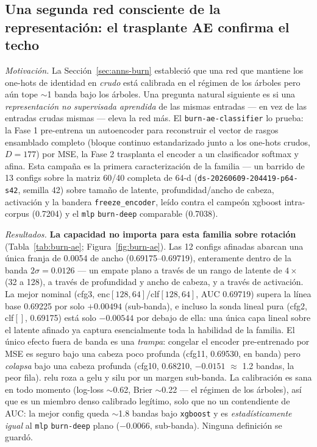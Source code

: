 \documentclass[11pt]{article}
\newcommand{\dsid}[1]{\texttt{\small #1}}
\begin{document}
\subsection{Una segunda red consciente de la representación: el trasplante AE confirma el techo}
\label{sec:anns-ae}
\emph{Motivación.} La Sección~\ref{sec:anns-burn} estableció que una red que
mantiene los one-hots de identidad en \emph{crudo} está calibrada en el régimen de
los árboles pero aún tope $\sim$1 banda bajo los árboles. Una pregunta natural
siguiente es si una \emph{representación no supervisada aprendida} de las mismas
entradas --- en vez de las entradas crudas mismas --- eleva la red más. El
\texttt{burn-ae-classifier} lo prueba: la Fase 1 pre-entrena un autoencoder para
reconstruir el vector de rasgos ensamblado completo (bloque continuo estandarizado
junto a los one-hots crudos, $D{=}177$) por MSE, la Fase 2 trasplanta el encoder a
un clasificador softmax y afina. Esta campaña es la primera caracterización de la
familia --- un barrido de 13 configs sobre la matriz 60/40 completa de 64-d
(\dsid{ds-20260609-204419-p64-s42}, semilla 42) sobre tamaño de latente,
profundidad/ancho de cabeza, activación y la bandera \texttt{freeze\_encoder},
leído contra el campeón xgboost intra-corpus (\num{0.7204}) y el \texttt{mlp}
\texttt{burn-deep} comparable (\num{0.7038}).

\emph{Resultados.} \textbf{La capacidad no importa para esta familia sobre
rotación} (Tabla~\ref{tab:burn-ae}; Figura~\ref{fig:burn-ae}). Las 12 configs
afinadas abarcan una única franja de \num{0.0054} de ancho
(\num{0.69175}--\num{0.69719}), enteramente dentro de la banda $2\sigma=0.0126$ ---
un empate plano a través de un rango de latente de $4\times$ (32 a 128), a través
de profundidad y ancho de cabeza, y a través de activación. La mejor nominal
(cfg3, enc$[128,64]$/clf$[128,64]$, AUC \num{0.69719}) supera la línea base
\num{0.69225} por solo $+0.00494$ (sub-banda), e incluso la sonda lineal pura
(cfg2, clf$[]$, \num{0.69175}) está solo $-0.00544$ por debajo de ella: una única
capa lineal sobre el latente afinado ya captura esencialmente toda la habilidad de
la familia. El único efecto fuera de banda es una \emph{trampa}: congelar el
encoder pre-entrenado por MSE es seguro bajo una cabeza poco profunda (cfg11,
\num{0.69530}, en banda) pero \emph{colapsa} bajo una cabeza profunda (cfg10,
\num{0.68210}, $-0.0151$ $\approx$ 1.2 bandas, la peor fila). relu roza a gelu y
silu por un margen sub-banda. La calibración es sana en todo momento (log-loss
$\sim$0.62, Brier $\sim$0.22 --- el régimen de los árboles), así que es un miembro
denso calibrado legítimo, solo que no un contendiente de AUC: la mejor config
queda $\sim$1.8 bandas bajo \texttt{xgboost} y es \emph{estadísticamente igual} al
\texttt{mlp} \texttt{burn-deep} plano ($-0.0066$, sub-banda). Ninguna definición se
guardó.
\end{document}
